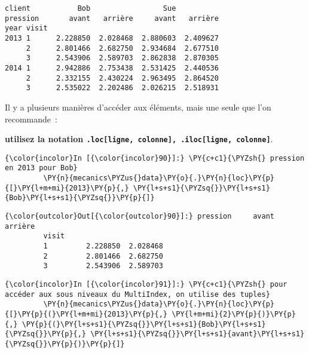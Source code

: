     \begin{Verbatim}[commandchars=\\\{\},frame=single,framerule=0.3mm,rulecolor=\color{cellframecolor}]
client           Bob                 Sue          
pression       avant   arrière     avant   arrière
year visit                                        
2013 1      2.228850  2.028468  2.880603  2.409627
     2      2.801466  2.682750  2.934684  2.677510
     3      2.543906  2.589703  2.862838  2.870305
2014 1      2.942886  2.753438  2.531425  2.440536
     2      2.332155  2.430224  2.963495  2.864520
     3      2.535022  2.202486  2.026215  2.518931
\end{Verbatim}

    Il y a plusieurs manières d'accéder aux éléments, mais une seule que
l'on recommande~:

\textbf{utilisez la notation
\texttt{.loc{[}ligne,\ colonne{]},\ .iloc{[}ligne,\ colonne{]}}}.

    \begin{Verbatim}[commandchars=\\\{\},frame=single,framerule=0.3mm,rulecolor=\color{cellframecolor}]
{\color{incolor}In [{\color{incolor}90}]:} \PY{c+c1}{\PYZsh{} pression en 2013 pour Bob}
         \PY{n}{mecanics\PYZus{}data}\PY{o}{.}\PY{n}{loc}\PY{p}{[}\PY{l+m+mi}{2013}\PY{p}{,} \PY{l+s+s1}{\PYZsq{}}\PY{l+s+s1}{Bob}\PY{l+s+s1}{\PYZsq{}}\PY{p}{]}
\end{Verbatim}


\begin{Verbatim}[commandchars=\\\{\},frame=single,framerule=0.3mm,rulecolor=\color{cellframecolor}]
{\color{outcolor}Out[{\color{outcolor}90}]:} pression     avant   arrière
         visit                       
         1         2.228850  2.028468
         2         2.801466  2.682750
         3         2.543906  2.589703
\end{Verbatim}
            
    \begin{Verbatim}[commandchars=\\\{\},frame=single,framerule=0.3mm,rulecolor=\color{cellframecolor}]
{\color{incolor}In [{\color{incolor}91}]:} \PY{c+c1}{\PYZsh{} pour accéder aux sous niveaux du MultiIndex, on utilise des tuples}
         \PY{n}{mecanics\PYZus{}data}\PY{o}{.}\PY{n}{loc}\PY{p}{[}\PY{p}{(}\PY{l+m+mi}{2013}\PY{p}{,} \PY{l+m+mi}{2}\PY{p}{)}\PY{p}{,} \PY{p}{(}\PY{l+s+s1}{\PYZsq{}}\PY{l+s+s1}{Bob}\PY{l+s+s1}{\PYZsq{}}\PY{p}{,} \PY{l+s+s1}{\PYZsq{}}\PY{l+s+s1}{avant}\PY{l+s+s1}{\PYZsq{}}\PY{p}{)}\PY{p}{]}
\end{Verbatim}


